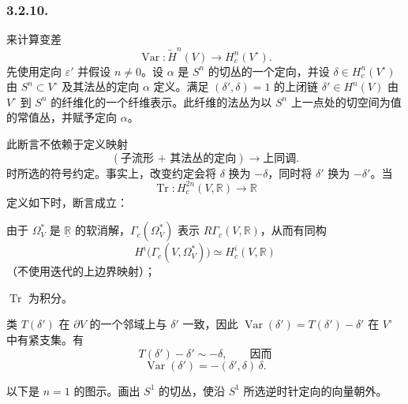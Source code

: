 \subsubsection*{3.2.10.}
来计算变差
\[
\operatorname{Var}:\widetilde H^n(V)
\longrightarrow H_c^n(V^\circ).
\]
先使用定向 $\varepsilon'$ 并假设 $n\ne0$。设 $\alpha$ 是 $S^n$ 的切丛的一个定向，并设 $\delta\in H_c^n(V^\circ)$ 由 $S^n\subset V^\circ$ 及其法丛的定向 $\alpha$ 定义。满足 $(\delta',\delta)=1$ 的上闭链 $\delta'\in H^n(V)$ 由 $V^\circ$ 到 $S^n$ 的纤维化的一个纤维表示。此纤维的法丛为以 $S^n$ 上一点处的切空间为值的常值丛，并赋予定向 $\alpha$。

此断言不依赖于定义映射
\[
(\text{子流形 + 其法丛的定向})
\longrightarrow\text{上同调}.
\]
时所选的符号约定。事实上，改变约定会将 $\delta$ 换为 $-\delta$，同时将 $\delta'$ 换为 $-\delta'$。当
\[
\operatorname{Tr}:H_c^{2n}(V,\mathbb R)\longrightarrow\mathbb R
\]
定义如下时，断言成立：
\begin{description}[leftmargin=2.8em,labelsep=.5em]
\item[\textup{($\alpha$)}] 由于 $\Omega_V^*$ 是 $\underline{\mathbb R}$ 的软消解，$\Gamma_c(\Omega_V^*)$ 表示 $R\Gamma_c(V,\mathbb R)$，从而有同构
\[
  H^i\bigl(\Gamma_c(V,\Omega_V^*)\bigr)
  \simeq H_c^i(V,\mathbb R)
  \]
（不使用迭代的上边界映射）；
\item[\textup{($\beta$)}] $\operatorname{Tr}$ 为积分。
\end{description}

类 $T(\delta')$ 在 $\partial V$ 的一个邻域上与 $\delta'$ 一致，因此
\(
\operatorname{Var}(\delta')=T(\delta')-\delta'
\)
在 $V^\circ$ 中有紧支集。有
\[
T(\delta')-\delta'\sim-\delta,
\qquad\text{因而}
\]
\[
\operatorname{Var}(\delta')
=-(\delta',\delta)\,\delta.
\]

以下是 $n=1$ 的图示。画出 $S^1$ 的切丛，使沿 $S^1$ 所选逆时针定向的向量朝外。

